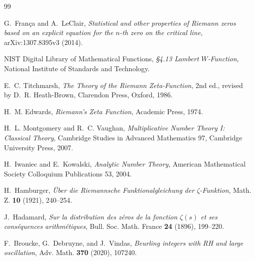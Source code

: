 \documentclass[11pt,reqno]{amsart}
\theoremstyle{definition}
\theoremstyle{remark}
\begin{document}
\begin{thebibliography}{99}

G.~Fran\c{c}a and A.~LeClair,
\emph{Statistical and other properties of Riemann zeros based on an explicit equation for the $n$-th zero on the critical line},
arXiv:1307.8395v3 (2014).

NIST Digital Library of Mathematical Functions,
\emph{\S4.13 Lambert $W$-Function},
National Institute of Standards and Technology.

E.~C. Titchmarsh,
\emph{The Theory of the Riemann Zeta-Function},
2nd ed., revised by D.~R. Heath-Brown,
Clarendon Press, Oxford, 1986.

H.~M. Edwards,
\emph{Riemann's Zeta Function},
Academic Press, 1974.

H.~L. Montgomery and R.~C. Vaughan,
\emph{Multiplicative Number Theory I: Classical Theory},
Cambridge Studies in Advanced Mathematics 97,
Cambridge University Press, 2007.

H.~Iwaniec and E.~Kowalski,
\emph{Analytic Number Theory},
American Mathematical Society Colloquium Publications 53, 2004.

H.~Hamburger, \emph{\"Uber die Riemannsche Funktionalgleichung der $\zeta$-Funktion},
Math. Z. \textbf{10} (1921), 240--254.

J.~Hadamard,
\emph{Sur la distribution des z\'eros de la fonction $\zeta(s)$ et ses cons\'equences arithm\'etiques},
Bull. Soc. Math. France \textbf{24} (1896), 199--220.

F.~Broucke, G.~Debruyne, and J.~Vindas,
\emph{Beurling integers with RH and large oscillation},
Adv. Math. \textbf{370} (2020), 107240.

\end{thebibliography}
\end{document}
